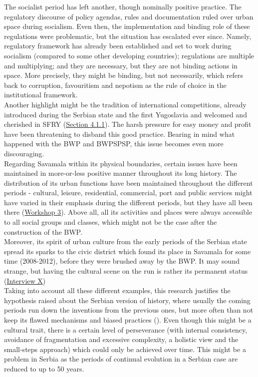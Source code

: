 \documentclass[11pt]{report}
\begin{document}
{{{The socialist period has left another, though nominally positive practice. The regulatory discourse of policy agendas, rules and documentation ruled over urban space during socialism. Even then, the implementation and binding role of these regulations were problematic, but the situation has escalated ever since. 
Namely, regulatory framework has already  been established and set to work during socialism  (compared to some other developing countries); regulations are multiple and multiplying; and they are necessary, but they are not binding actions in space. More precisely, they might be binding, but not necessarily, which refers back to corruption, favouritism and nepotism as the rule of choice in the institutional framework.
\\

Another highlight might be the tradition of international competitions, already introduced during the Serbian state and the first Yugoslavia and welcomed and cherished in SFRY (\href{Section 4.1.1}{Section 4.1.1}).
The harsh pressure for easy money and profit have been threatening  to disband this good practice. Bearing in mind what happened with the BWP and BWPSPSP, this issue becomes even more discouraging.
\\

Regarding Savamala within its physical boundaries, certain issues have been maintained in more-or-less positive manner throughout its long history. The distribution of its urban functions have been maintained throughout the different periods - cultural, leisure, residential, commercial, port and public services might have varied in their emphasis during the different periods, but they have all been there 
(\href{Student Workshop}{Workshop 3}).
Above all, all its activities and places were always accessible to all social groups and classes, which might not be the case after the construction of the BWP.
\\

Moreover, its spirit of urban culture from the early periods of the Serbian state spread its sparks to the civic district which found its place in Savamala for some time (2008-2012), before they were brushed away by the BWP. It may sound strange, but having the cultural scene on the run is rather its permanent status
(\href{InterviewX}{Interview X})
\\

Taking into account all these different examples, this research justifies the hypothesis raised about the Serbian version of history, where usually the coming periods run down the inventions from the previous ones, but more often than not keep its flawed mechanisms and biased practices (\href{Peric}{\citealt{peric_evolution_2016}}).
Even though this might be a cultural trait, there is a certain level of perseverance (with internal consistency, avoidance of fragmentation and excessive complexity, a holistic view and the small-steps approach) which could only be achieved over time. This might be a problem in Serbia as the periods of continual evolution in a Serbian case are reduced to up to 50 years.
  
}}}
\end{document}
